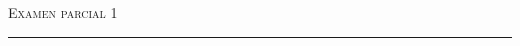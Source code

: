 \documentclass[11pt]{article}
\date{}
\newcommand{\myTitle}{Examen parcial 1}
\theoremstyle{Tema} \newtheorem{Tema}{Tema} %
\theoremstyle{Tema} \newtheorem{Serie}{Serie}              %
\theoremstyle{Tema} \newtheorem{Ejercicio}{Ejercicio}    %
\begin{document}
\pagestyle{allStyle}

\thispagestyle{firststyle}
\begin{center}
\LARGE
\textsc{\myTitle} %
\medskip
\hrule height 1.5pt
\end{center}


\vspace{0.1 in}






\end{document}
